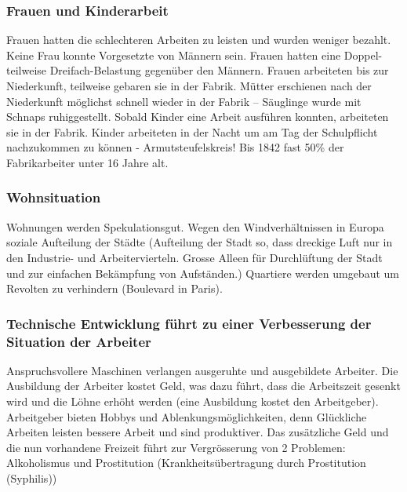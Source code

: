 \documentclass[10pt, openright=true]{scrartcl}
\begin{document}
\subsubsection{Frauen und Kinderarbeit}
Frauen hatten die schlechteren Arbeiten zu leisten und wurden weniger bezahlt. Keine Frau konnte Vorgesetzte von Männern sein. Frauen hatten eine Doppel- teilweise Dreifach-Belastung gegenüber den Männern. Frauen arbeiteten bis zur Niederkunft, teilweise gebaren sie in der Fabrik. Mütter erschienen nach der Niederkunft möglichst schnell wieder in der Fabrik – Säuglinge wurde mit Schnaps ruhiggestellt. Sobald Kinder eine Arbeit ausführen konnten, arbeiteten sie in der Fabrik. Kinder arbeiteten in der Nacht um am Tag der Schulpflicht nachzukommen zu können - Armutsteufelskreis! Bis 1842 fast 50\% der Fabrikarbeiter unter 16 Jahre alt.
\subsubsection{Wohnsituation}
Wohnungen werden Spekulationsgut. Wegen den Windverhältnissen in Europa soziale Aufteilung der Städte (Aufteilung der Stadt so, dass dreckige Luft nur in den Industrie- und Arbeitervierteln. Grosse Alleen für Durchlüftung der Stadt und zur einfachen Bekämpfung von Aufständen.) Quartiere werden umgebaut um Revolten zu verhindern (Boulevard in Paris).
\subsubsection{Technische Entwicklung führt zu einer Verbesserung der Situation der Arbeiter}
Anspruchsvollere Maschinen verlangen ausgeruhte und ausgebildete Arbeiter. Die Ausbildung der Arbeiter kostet Geld, was dazu führt, dass die Arbeitszeit gesenkt wird und die Löhne erhöht werden (eine Ausbildung kostet den Arbeitgeber). Arbeitgeber bieten Hobbys und Ablenkungsmöglichkeiten, denn Glückliche Arbeiten leisten bessere Arbeit und sind produktiver. Das zusätzliche Geld und die nun vorhandene Freizeit führt zur Vergrösserung von 2 Problemen: Alkoholismus und Prostitution (Krankheitsübertragung durch Prostitution (Syphilis))
\end{document}
